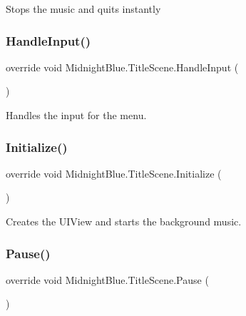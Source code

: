 Stops the music and quits instantly 

\hypertarget{class_midnight_blue_1_1_title_scene_a54dc02f150eb90dac2fcc6e37a077723}{}\label{class_midnight_blue_1_1_title_scene_a54dc02f150eb90dac2fcc6e37a077723} 
\subsubsection{\texorpdfstring{Handle\+Input()}{HandleInput()}}
{\footnotesize\ttfamily override void Midnight\+Blue.\+Title\+Scene.\+Handle\+Input (\begin{DoxyParamCaption}{ }\end{DoxyParamCaption})\hspace{0.3cm}{\ttfamily [inline]}}



Handles the input for the menu. 

\hypertarget{class_midnight_blue_1_1_title_scene_a793aa8253fba8d62a4ee19f042b22891}{}\label{class_midnight_blue_1_1_title_scene_a793aa8253fba8d62a4ee19f042b22891} 
\subsubsection{\texorpdfstring{Initialize()}{Initialize()}}
{\footnotesize\ttfamily override void Midnight\+Blue.\+Title\+Scene.\+Initialize (\begin{DoxyParamCaption}{ }\end{DoxyParamCaption})\hspace{0.3cm}{\ttfamily [inline]}}



Creates the U\+I\+View and starts the background music. 

\hypertarget{class_midnight_blue_1_1_title_scene_a046934bfa3290d443b58bcc1de0919db}{}\label{class_midnight_blue_1_1_title_scene_a046934bfa3290d443b58bcc1de0919db} 
\subsubsection{\texorpdfstring{Pause()}{Pause()}}
{\footnotesize\ttfamily override void Midnight\+Blue.\+Title\+Scene.\+Pause (\begin{DoxyParamCaption}{ }\end{DoxyParamCaption})\hspace{0.3cm}{\ttfamily [inline]}}



